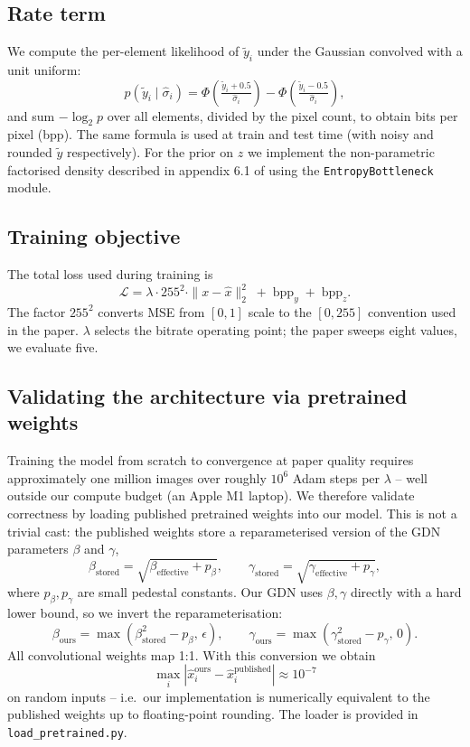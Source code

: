 \documentclass[review]{elsarticle}
\begin{document}
\subsection{Rate term}
We compute the per-element likelihood of $\tilde y_i$ under the Gaussian convolved with a unit uniform:
\begin{equation}
p(\tilde y_i \mid \hat\sigma_i) = \Phi\!\left(\tfrac{\tilde y_i + 0.5}{\hat\sigma_i}\right) - \Phi\!\left(\tfrac{\tilde y_i - 0.5}{\hat\sigma_i}\right),
\end{equation}
and sum $-\log_2 p$ over all elements, divided by the pixel count, to obtain bits per pixel (bpp). The same formula is used at train and test time (with noisy and rounded $\tilde y$ respectively). For the prior on $z$ we implement the non-parametric factorised density described in appendix 6.1 of \cite{balle2018} using the \texttt{EntropyBottleneck} module.

\subsection{Training objective}
The total loss used during training is
\begin{equation}
\mathcal{L} = \lambda \cdot 255^2 \cdot \|x - \hat x\|_2^2 \; + \; \mathrm{bpp}_y \; + \; \mathrm{bpp}_z.
\end{equation}
The factor $255^2$ converts MSE from $[0,1]$ scale to the $[0,255]$ convention used in the paper. $\lambda$ selects the bitrate operating point; the paper sweeps eight values, we evaluate five.

\subsection{Validating the architecture via pretrained weights}
\label{sec:validate}
Training the model from scratch to convergence at paper quality requires approximately one million images over roughly $10^6$ Adam steps per $\lambda$ \cite{balle2018} -- well outside our compute budget (an Apple M1 laptop). We therefore validate correctness by loading published pretrained weights into our model. This is not a trivial cast: the published weights store a reparameterised version of the GDN parameters $\beta$ and $\gamma$,
\begin{equation}
\beta_\text{stored} = \sqrt{\beta_\text{effective} + p_\beta}, \qquad \gamma_\text{stored} = \sqrt{\gamma_\text{effective} + p_\gamma},
\end{equation}
where $p_\beta, p_\gamma$ are small pedestal constants. Our GDN uses $\beta, \gamma$ directly with a hard lower bound, so we invert the reparameterisation:
\begin{equation}
\beta_\text{ours} = \max(\beta_\text{stored}^2 - p_\beta,\, \epsilon), \qquad \gamma_\text{ours} = \max(\gamma_\text{stored}^2 - p_\gamma,\, 0).
\end{equation}
All convolutional weights map 1:1. With this conversion we obtain
\[
\max_{i} |\hat x^\text{ours}_i - \hat x^\text{published}_i| \approx 10^{-7}
\]
on random inputs -- i.e.\ our implementation is numerically equivalent to the published weights up to floating-point rounding. The loader is provided in \texttt{load\_pretrained.py}.
\end{document}
